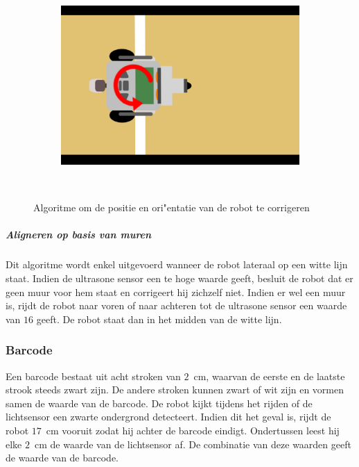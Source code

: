 \documentclass[eind]{penoverslag}
\begin{document}
\begin{figure}
\begin{subfigure}[h]{0.24\textwidth}
		\caption{ }
		\label{fig:AlgoWit6}
	\end{subfigure}
	\begin{subfigure}[h]{0.24\textwidth}
		\includegraphics[width=\textwidth]{WitteLijn7}
		\caption{ }
		\label{fig:AlgoWit7}
	\end{subfigure}\\
	\caption{Algoritme om de positie en ori"entatie van de robot te corrigeren}
	\label{fig:AlgoWit}
\end{figure}

\subparagraph{Aligneren op basis van muren}
Dit algoritme wordt enkel uitgevoerd wanneer de robot lateraal op een witte lijn staat. Indien de ultrasone sensor een te hoge waarde geeft, besluit de robot dat er geen muur voor hem staat en corrigeert hij zichzelf niet. Indien er wel een muur is, rijdt de robot naar voren of naar achteren tot de ultrasone sensor een waarde van $16$ geeft. De robot staat dan in het midden van de witte lijn.

\subsubsection{Barcode}
\label{sssec:AlgoBar}
Een barcode bestaat uit acht stroken van $2$~cm, waarvan de eerste en de laatste strook steeds zwart zijn. De andere stroken kunnen zwart of wit zijn en vormen samen de waarde van de barcode. De robot kijkt tijdens het rijden of de lichtsensor een zwarte ondergrond detecteert. Indien dit het geval is, rijdt de robot $17$~cm vooruit zodat hij achter de barcode eindigt. Ondertussen leest hij elke $2$~cm de waarde van de lichtsensor af. De combinatie van deze waarden geeft de waarde van de barcode.\\
\end{document}
